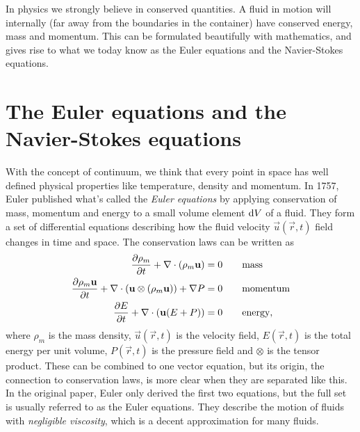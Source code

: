 In physics we strongly believe in conserved quantities. A fluid in motion will internally (far away from the boundaries in the container) have conserved energy, mass and momentum. This can be formulated beautifully with mathematics, and gives rise to what we today know as the Euler equations and the Navier-Stokes equations.
\section{The Euler equations and the Navier-Stokes equations}
\label{sec:theory_of_fluids_euler_navier}
With the concept of continuum, we think that every point in space has well defined physical properties like temperature, density and momentum. In 1757, Euler published what's called the \textit{Euler equations} by applying conservation of mass, momentum and energy to a small volume element $\mathrm{d}V$ of a fluid. They form a set of differential equations describing how the fluid velocity $\vec u(\vec r, t)$ field changes in time and space. The conservation laws can be written as
\begin{align}
	\frac{\partial \rho_m}{\partial t} + \nabla\cdot (\rho_m\mathbf u) &= 0 \qquad \text{mass}\\
	\frac{\partial \rho_m \mathbf u}{\partial t} + \nabla \cdot (\mathbf u \otimes (\rho_m\mathbf u)) + \nabla P &= 0\qquad \text{momentum}\\
	\frac{\partial E}{\partial t} + \nabla\cdot (\mathbf u(E + P)) &= 0\qquad \text{energy},
\end{align}
where $\rho_m$ is the mass density, $\vec u(\vec r, t)$ is the velocity field, $E(\vec r, t)$ is the total energy per unit volume, $P(\vec r, t)$ is the pressure field and $\otimes$ is the tensor product. These can be combined to one vector equation, but its origin, the connection to conservation laws, is more clear when they are separated like this. In the original paper, Euler only derived the first two equations, but the full set is usually referred to as the Euler equations. They describe the motion of fluids with \textit{negligible viscosity}, which is a decent approximation for many fluids.


